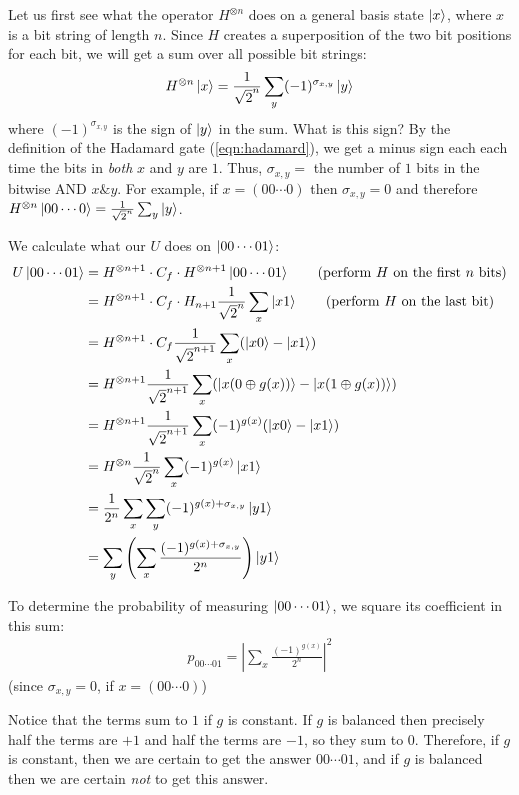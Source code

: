 \documentclass[a4paper, 11pt]{article}
\theoremstyle{definition}
\begin{document}
Let us first see what the operator $H^{\otimes n}$ does on a general basis state $\ket{x}$, where $x$ is a bit string of length $n$.
Since $H$ creates a superposition of the two bit positions for each bit, we will get a sum over all possible bit strings:
\begin{align*}
  H^{\otimes n} \ket{x} = \frac{1}{\sqrt{2}^n} \sum_y (-1)^{\sigma_{x,y}} \ket{y}
\end{align*}
where $(-1)^{\sigma_{x,y}}$ is the sign of $\ket{y}$ in the sum.
What is this sign?
By the definition of the Hadamard gate (\ref{eqn:hadamard}), we get a minus sign each each time the bits in \emph{both} $x$ and $y$ are $1$.
Thus, $\sigma_{x,y} =$ the number of $1$ bits in the bitwise AND $x \& y$.
For example, if $x = (00\cdots0)$ then $\sigma_{x,y} = 0$ and therefore $H^{\otimes n} \ket{00\cdots0} = \frac{1}{\sqrt{2}^n} \sum_y \ket{y}$.

We calculate what our $U$ does on $\ket{00\cdots01}$:
\begin{align*}
  U\ket{00\cdots01} &= H^{\otimes n+1} \cdot C_f \cdot H^{\otimes n+1} \ket{00\cdots01} \tag{perform $H$ on the first $n$ bits}\\
  &= H^{\otimes n+1} \cdot C_f \cdot H_{n+1} \frac{1}{\sqrt{2}^n} \sum_x \ket{x1} \tag{perform $H$ on the last bit}\\
  &= H^{\otimes n+1} \cdot C_f \frac{1}{\sqrt{2}^{n+1}} \sum_x (\ket{x0} - \ket{x1}) \\
  &= H^{\otimes n+1} \frac{1}{\sqrt{2}^{n+1}} \sum_x (\ket{x(0 \oplus g(x))} - \ket{x(1 \oplus g(x))}) \\
  &= H^{\otimes n+1} \frac{1}{\sqrt{2}^{n+1}} \sum_x (-1)^{g(x)}(\ket{x0} - \ket{x1}) \\
  &= H^{\otimes n} \frac{1}{\sqrt{2}^{n}} \sum_x (-1)^{g(x)}\ket{x1} \\
  &= \frac{1}{2^n} \sum_x \sum_y (-1)^{g(x)+\sigma_{x,y}}\ket{y1} \\
  &= \sum_y \left(\sum_x \frac{(-1)^{g(x)+\sigma_{x,y}}}{2^n}\right)\ket{y1}
\end{align*}

To determine the probability of measuring $\ket{00\cdots01}$, we square its coefficient in this sum:
\begin{align*}
  p_{00\cdots01} =\left|\sum_x \frac{(-1)^{g(x)}}{2^n}\right|^2
\end{align*}
(since $\sigma_{x,y} = 0$, if $x = (00\cdots0)$)

Notice that the terms sum to $1$ if $g$ is constant. If $g$ is balanced then precisely half the terms are $+1$ and half the terms are $-1$, so they sum to $0$.
Therefore, if $g$ is constant, then we are certain to get the answer $00\cdots01$, and if $g$ is balanced then we are certain \emph{not} to get this answer.
\end{document}

